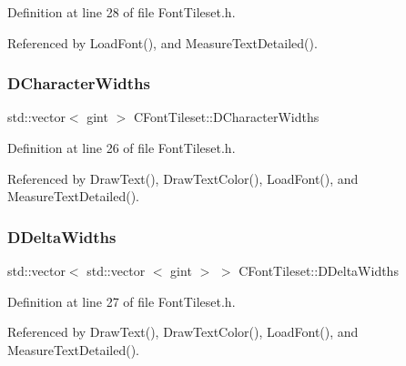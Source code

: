 Definition at line 28 of file Font\+Tileset.\+h.



Referenced by Load\+Font(), and Measure\+Text\+Detailed().

\hypertarget{classCFontTileset_ad25347b5350a8380be8c550d9f2e2798}{}\label{classCFontTileset_ad25347b5350a8380be8c550d9f2e2798} 
\subsubsection{\texorpdfstring{D\+Character\+Widths}{DCharacterWidths}}
{\footnotesize\ttfamily std\+::vector$<$ gint $>$ C\+Font\+Tileset\+::\+D\+Character\+Widths\hspace{0.3cm}{\ttfamily [protected]}}



Definition at line 26 of file Font\+Tileset.\+h.



Referenced by Draw\+Text(), Draw\+Text\+Color(), Load\+Font(), and Measure\+Text\+Detailed().

\hypertarget{classCFontTileset_a1e253853e14282e9582a7f47dace8f70}{}\label{classCFontTileset_a1e253853e14282e9582a7f47dace8f70} 
\subsubsection{\texorpdfstring{D\+Delta\+Widths}{DDeltaWidths}}
{\footnotesize\ttfamily std\+::vector$<$ std\+::vector $<$ gint $>$ $>$ C\+Font\+Tileset\+::\+D\+Delta\+Widths\hspace{0.3cm}{\ttfamily [protected]}}



Definition at line 27 of file Font\+Tileset.\+h.



Referenced by Draw\+Text(), Draw\+Text\+Color(), Load\+Font(), and Measure\+Text\+Detailed().

\hypertarget{classCFontTileset_ae6e92dd613809fb15892b51e0e6b4940}{}\label{classCFontTileset_ae6e92dd613809fb15892b51e0e6b4940} 
